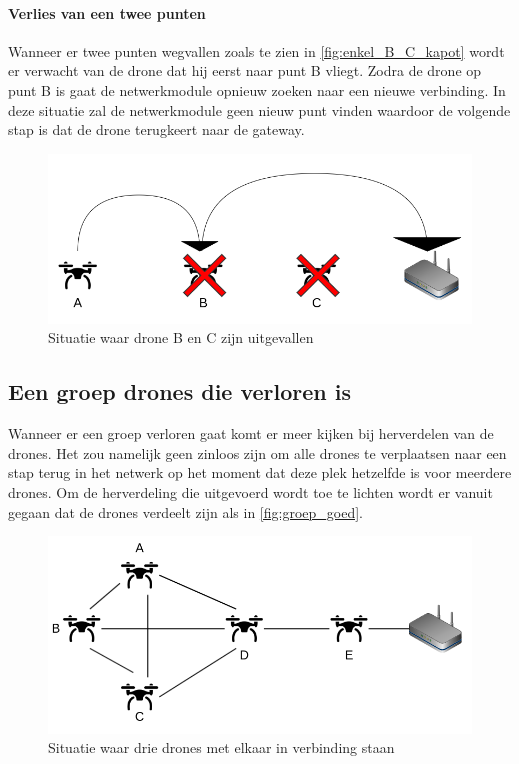 \documentclass[a4paper, 11pt, oneside]{report}
\begin{document}
\paragraph{Verlies van een twee punten}
Wanneer er twee punten wegvallen zoals te zien in \autoref{fig:enkel_B_C_kapot} wordt er verwacht van de drone dat hij eerst naar punt B vliegt.
Zodra de drone op punt B is gaat de netwerkmodule opnieuw zoeken naar een nieuwe verbinding.
In deze situatie zal de netwerkmodule geen nieuw punt vinden waardoor de volgende stap is dat de drone terugkeert naar de gateway.  
\begin{figure}[H]
	\begin{center}\includegraphics[width=1\linewidth]{Afbeeldingen/droneopstelling_enkel_B_en_C_kapot.png}\end{center}
	\caption{Situatie waar drone B en C zijn uitgevallen}
	\label{fig:enkel_B_C_kapot}
\end{figure}
 
\subsection{Een groep drones die verloren is}\label{sec:een-groep-drones-die-verloren-is}

Wanneer er een groep verloren gaat komt er meer kijken bij herverdelen van de drones.
Het zou namelijk geen zinloos zijn om alle drones te verplaatsen naar een stap terug in het netwerk op het moment dat deze plek hetzelfde is voor meerdere drones.
Om de herverdeling die uitgevoerd wordt toe te lichten wordt er vanuit gegaan dat de drones verdeelt zijn als in \autoref{fig:groep_goed}.

\begin{figure}[H]
	\begin{center}\includegraphics[width=1\linewidth]{Afbeeldingen/droneopstelling_Groep_goed.png}\end{center}
	\caption{Situatie waar drie drones met elkaar in verbinding staan}
	\label{fig:groep_goed}
\end{figure} 
\end{document}

